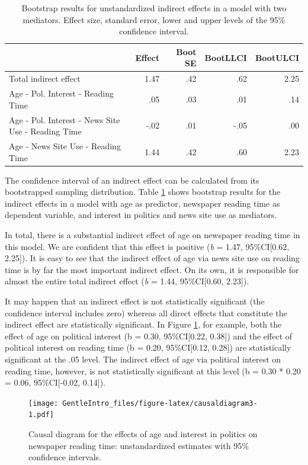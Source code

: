 \documentclass[a4paper]{book}
\theoremstyle{definition}
\theoremstyle{definition}
\theoremstyle{definition}
\theoremstyle{remark}
\begin{document}
\begin{table}[H]

\caption{\label{tab:indirect-sim}Bootstrap results for unstandardized indirect effects in a model with two mediators. Effect size, standard error, lower and upper levels of the 95\% confidence interval.}
\centering
\fontsize{8}{8}\selectfont
\begin{tabular}[t]{lrrrr}
\hline
 & Effect & Boot SE & BootLLCI & BootULCI\\
\hline
Total indirect effect & 1.47 & .42 & .62 & 2.25\\
Age - Pol. Interest - Reading Time & .05 & .03 & .01 & .14\\
Age - Pol. Interest - News Site Use - Reading Time & -.02 & .01 & -.05 & .00\\
Age - News Site Use - Reading Time & 1.44 & .42 & .60 & 2.23\\
\hline
\end{tabular}
\end{table}

The confidence interval of an indirect effect can be calculated from its
bootstrapped sampling distribution. Table \ref{tab:indirect-sim} shows
bootstrap results for the indirect effects in a model with age as
predictor, newspaper reading time as dependent variable, and interest in
politics and news site use as mediators.

In total, there is a substantial indirect effect of age on newspaper
reading time in this model. We are confident that this effect is
positive (\emph{b} = 1.47, 95\%CI{[}0.62, 2.25{]}). It is easy to see
that the indirect effect of age via news site use on reading time is by
far the most important indirect effect. On its own, it is responsible
for almost the entire total indirect effect (\emph{b} = 1.44,
95\%CI{[}0.60, 2.23{]}).

It may happen that an indirect effect is not statistically significant
(the confidence interval includes zero) whereas all direct effects that
constitute the indirect effect are statistically significant. In Figure
\ref{fig:causaldiagram3}, for example, both the effect of age on
political interest (b = 0.30, 95\%CI{[}0.22, 0.38{]}) and the effect of
political interest on reading time (b = 0.20, 95\%CI{[}0.12, 0.28{]})
are statistically significant at the .05 level. The indirect effect of
age via political interest on reading time, however, is not
statistically significant at this level (b = 0.30 * 0.20 = 0.06,
95\%CI{[}-0.02, 0.14{]}).

\begin{figure}
\centering
\texttt{[image: GentleIntro\_files/figure-latex/causaldiagram3-1.pdf]}
\caption{\label{fig:causaldiagram3}Causal diagram for the effects of age and
interest in politics on newspaper reading time: unstandardized estimates
with 95\% confidence intervals.}
\end{figure}
\end{document}
